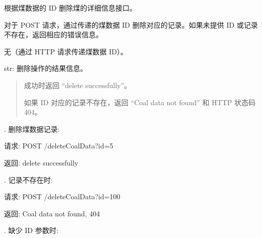 \documentclass[a4paper,12pt,english]{sphinxmanual}
\begin{document}
\begin{fulllineitems}
\label{\detokenize{api/login:login.deleteCoalData}}
\pysigstartsignatures
{}
\pysigstopsignatures
\sphinxAtStartPar
根据煤数据的 ID 删除煤的详细信息接口。
\begin{description}
\sphinxAtStartPar
对于 POST 请求，通过传递的煤数据 ID 删除对应的记录。如果未提供 ID 或记录不存在，返回相应的错误信息。

\sphinxAtStartPar
无（通过 HTTP 请求传递煤数据 ID）。

\sphinxAtStartPar
str: 删除操作的结果信息。
\begin{quote}

\sphinxAtStartPar
成功时返回 “delete successfully”。

\sphinxAtStartPar
如果 ID 对应的记录不存在，返回 “Coal data not found” 和 HTTP 状态码 404。
\end{quote}

. 删除煤数据记录:

\begin{sphinxVerbatim}[commandchars=\\\{\}]
请求:
POST /deleteCoalData?id=5

返回:
\PYGZdq{}delete successfully\PYGZdq{}
\end{sphinxVerbatim}

. 记录不存在时:

\begin{sphinxVerbatim}[commandchars=\\\{\}]
请求:
POST /deleteCoalData?id=100

返回:
\PYGZdq{}Coal data not found\PYGZdq{}, 404
\end{sphinxVerbatim}

. 缺少 ID 参数时:

\begin{sphinxVerbatim}[commandchars=\\\{\}]
 

 
\end{sphinxVerbatim}

\end{description}

\end{fulllineitems}
\end{document}
